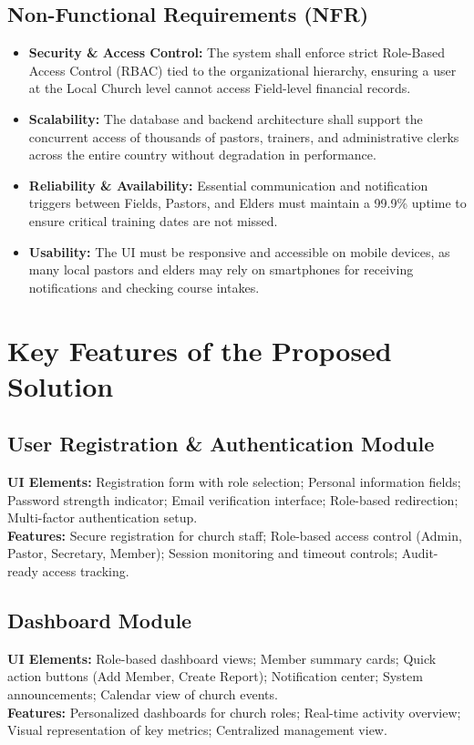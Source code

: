 \documentclass[12pt]{report}
\begin{document}
\subsection{Non-Functional Requirements (NFR)}
\begin{itemize}
    \setlength{\itemsep}{0.5em}
    \item \textbf{Security \& Access Control:} The system shall enforce strict Role-Based Access Control (RBAC) tied to the organizational hierarchy, ensuring a user at the Local Church level cannot access Field-level financial records.
    \item \textbf{Scalability:} The database and backend architecture shall support the concurrent access of thousands of pastors, trainers, and administrative clerks across the entire country without degradation in performance.
    \item \textbf{Reliability \& Availability:} Essential communication and notification triggers between Fields, Pastors, and Elders must maintain a 99.9\% uptime to ensure critical training dates are not missed.
    \item \textbf{Usability:} The UI must be responsive and accessible on mobile devices, as many local pastors and elders may rely on smartphones for receiving notifications and checking course intakes.
\end{itemize}

\section{Key Features of the Proposed Solution}

\subsection{User Registration \& Authentication Module}
\textbf{UI Elements:} Registration form with role selection; Personal information fields; Password strength indicator; Email verification interface; Role-based redirection; Multi-factor authentication setup. \\
\textbf{Features:} Secure registration for church staff; Role-based access control (Admin, Pastor, Secretary, Member); Session monitoring and timeout controls; Audit-ready access tracking.

\subsection{Dashboard Module}
\textbf{UI Elements:} Role-based dashboard views; Member summary cards; Quick action buttons (Add Member, Create Report); Notification center; System announcements; Calendar view of church events. \\
\textbf{Features:} Personalized dashboards for church roles; Real-time activity overview; Visual representation of key metrics; Centralized management view.
\end{document}
